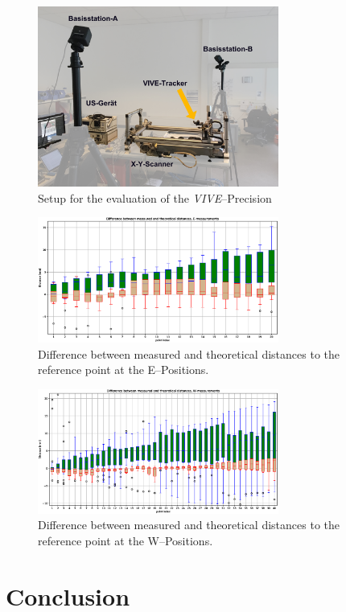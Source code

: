\documentclass{VRARWorkshop}
\begin{document}
\begin{figure}[h!]
    \begin{center}
        \includegraphics[width=79mm]{images/PrecisionMeasurement.jpg}
        \caption{\label{fig:precisionMeasurement} Setup for the evaluation of the \textit{VIVE}--Precision}
    \end{center}
\end{figure}

\begin{figure}[h!]
    \begin{center}
        \includegraphics[width=79mm]{images/distancesBoxplot-E.eps}
        \caption{\label{fig:boxplotE} Difference between measured and theoretical distances to the reference point at the E--Positions.}
    \end{center}
\end{figure}

\begin{figure}[h!]
    \begin{center}
        \includegraphics[width=79mm]{images/distancesBoxplot-W.eps}
        \caption{\label{fig:boxplotW} Difference between measured and theoretical distances to the reference point at the W--Positions.}
    \end{center}
\end{figure}

\section{Conclusion}

\VRARsetbibstyle

\end{document}
